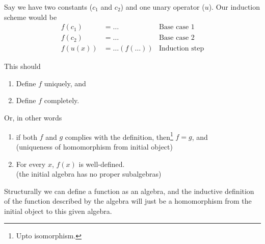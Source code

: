 \documentclass{amsart}
\theoremstyle{definition}
\begin{document}
Say we have two constants ($c_1$ and $c_2$) and one unary operator ($u$). Our induction scheme would be 
\begin{align*}
f(c_1) &= \dots & \text{Base case 1} \\
f(c_2) &= \dots & \text{Base case 2} \\
f(u(x)) &= \dots(f(\dots)) & \text{Induction step}
\end{align*}

This should 
\begin{enumerate}
\item Define $f$ uniquely, and
\item Define $f$ completely.
\end{enumerate}

Or, in other words
\begin{enumerate}
\item if both $f$ and $g$ complies with the definition, then\footnote{Upto isomorphism.} $f = g$, and \\
(uniqueness of homomorphism from initial object)
\item For every $x$, $f(x)$ is well-defined.\\
(the initial algebra has no proper subalgebras)
\end{enumerate}

Structurally we can define a function as an algebra, and the inductive definition of the function described by the algebra will just be a homomorphism from the initial object to this given algebra. 
\end{document}
